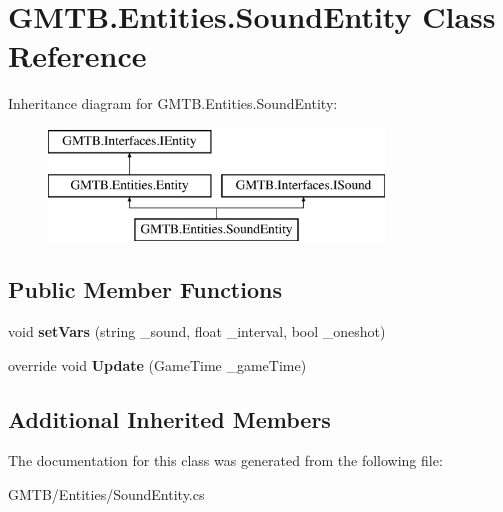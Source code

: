 \hypertarget{class_g_m_t_b_1_1_entities_1_1_sound_entity}{}\section{G\+M\+T\+B.\+Entities.\+Sound\+Entity Class Reference}
\label{class_g_m_t_b_1_1_entities_1_1_sound_entity}
Inheritance diagram for G\+M\+T\+B.\+Entities.\+Sound\+Entity\+:\begin{figure}[H]
\begin{center}
\leavevmode
\includegraphics[height=3.000000cm]{class_g_m_t_b_1_1_entities_1_1_sound_entity}
\end{center}
\end{figure}
\subsection*{Public Member Functions}
\begin{DoxyCompactItemize}
\item 
\mbox{\label{class_g_m_t_b_1_1_entities_1_1_sound_entity_aa8584c0df82c38c8aa4e4ed3c2841c5f}} 
void {\bfseries set\+Vars} (string \+\_\+sound, float \+\_\+interval, bool \+\_\+oneshot)
\item 
\mbox{\label{class_g_m_t_b_1_1_entities_1_1_sound_entity_aef441ff0fcd1cdaab4f30830cf7beb1a}} 
override void {\bfseries Update} (Game\+Time \+\_\+game\+Time)
\end{DoxyCompactItemize}
\subsection*{Additional Inherited Members}


The documentation for this class was generated from the following file\+:\begin{DoxyCompactItemize}
\item 
G\+M\+T\+B/\+Entities/Sound\+Entity.\+cs\end{DoxyCompactItemize}

